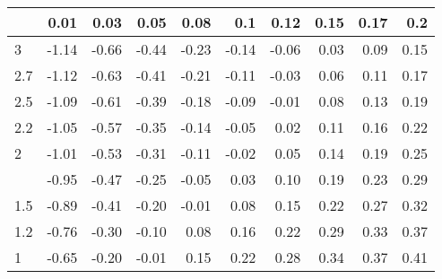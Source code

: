 
\begin{tabular}{lrrrrrrrrr}
\toprule
  & 0.01 & 0.03 & 0.05 & 0.08 & 0.1 & 0.12 & 0.15 & 0.17 & 0.2\\
\midrule
3 & -1.14 & -0.66 & -0.44 & -0.23 & -0.14 & -0.06 & 0.03 & 0.09 & 0.15\\
2.7 & -1.12 & -0.63 & -0.41 & -0.21 & -0.11 & -0.03 & 0.06 & 0.11 & 0.17\\
2.5 & -1.09 & -0.61 & -0.39 & -0.18 & -0.09 & -0.01 & 0.08 & 0.13 & 0.19\\
2.2 & -1.05 & -0.57 & -0.35 & -0.14 & -0.05 & 0.02 & 0.11 & 0.16 & 0.22\\
2 & -1.01 & -0.53 & -0.31 & -0.11 & -0.02 & 0.05 & 0.14 & 0.19 & 0.25\\
\addlinespace
1.7 & -0.95 & -0.47 & -0.25 & -0.05 & 0.03 & 0.10 & 0.19 & 0.23 & 0.29\\
1.5 & -0.89 & -0.41 & -0.20 & -0.01 & 0.08 & 0.15 & 0.22 & 0.27 & 0.32\\
1.2 & -0.76 & -0.30 & -0.10 & 0.08 & 0.16 & 0.22 & 0.29 & 0.33 & 0.37\\
1 & -0.65 & -0.20 & -0.01 & 0.15 & 0.22 & 0.28 & 0.34 & 0.37 & 0.41\\
\bottomrule
\end{tabular}

